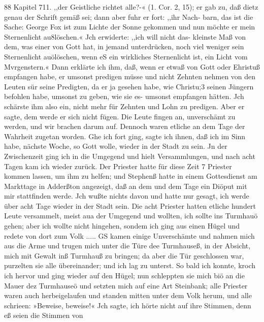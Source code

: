 88 Kapitel 711.
,,der Geistliche richtet alle?-« (1. Cor. 2, 15); er gab zu, daß dietz
genau der Schrift gemäß sei; dann aber fuhr er fort: ,,ihr Nach-
barn, das ist die Sache: George Fox ist zum Lichte der Sonne
gekommen und nun möchte er mein Sternenlicht au8löschen.« Jch
erwiderte: ,,ich will nicht das- kleinste Maß von dem, was einer
von Gott hat, in jemand unterdrücken, noch viel weniger sein
Sternenlicht auölöschen, wenn eS ein wirkliches Sternenlicht ist,
ein Licht vom Mvrgenstern.« Dann erklärte ich ihm, daß, wenn
er etwaß von Gott oder Ehristuß empfangen habe, er umsonst
predigen müsse und nicht Zehnten nehmen von den Leuten sür
seine Predigten, da er ja gesehen habe, wie Christu;3 seinen
Jüngern befohlen habe, umsonst zu geben, wie sie es- umsonst
empfangen hätten. Jch schärste ihm also ein, nicht mehr für
Zehnten und Lohn zu predigen. Aber er sagte, dem werde er
sich nicht fügen. Die Leute fingen an, unverschämt zu werden,
und wir brachen darum auf. Dennoch waren etliche an dem
Tage der Wahrheit zugetan worden. Ghe ich fort ging, sagte
ich ihnen, daß ich im Sinn habe, nächste Woche, so Gott wolle,
wieder in der Stadt zu sein. Jn der Zwischenzeit ging ich in
die Umgegend und hielt Versammlungen, und nach acht Tagen
kam ich wieder zurück. Der Priester hatte für diese Zeit 7 Priester
kommen lassen, um ihm zu helfen; und Stephenß hatte in einem
Gottesdienst am Markttage in Adderßton angezeigt, daß an dem
und dem Tage ein Diöput mit mir stattfinden werde. Jch wußte
nichts davon und hatte nur gesagt, ich werde über acht Tage
wieder in der Stadt sein. Die acht Priester hatten etliche hundert
Leute versammelt, meist aua der Umgegend und wollten, ich sollte
ins Turmhauö gehen; aber ich wollte nicht hingehen, sondem
ich ging aus einen Hügel und redete von dort zum Volk .....
GS kamen einige Unverschämte und nahmen mich aus die
Arme und trugen mich unter die Türe dee Turmhauseß, in der
Absicht, mich mit Gewalt inß Turmhauß zu bringen; da aber
die Tür geschlossen war, purzelten sie alle übereinander; und ich
lag zu unterst. So bald ich konnte, kroch ich hervor und ging wieder
auf den Hügel; nun schleppten sie mich biö an die Mauer
dez Turmhauseö und setzten mich auf eine Art Steinbank; alle
Priester waren auch herbeigelaufen und standen mitten unter dem
Volk herum, und alle schrieen: »Beweise, beweise!« Jch sagte,
ich hörte nicht auf ihre Stimmen, denn eß seien die Stimmen von


